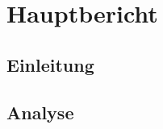 \documentclass[12pt, a4paper]{report}
\begin{document}
	
	
	
		
	
	
	
	
	
	\part{Hauptbericht}
	
	\chapter{Einleitung}
	
	
	
	
	
	
	\chapter{Analyse}
	
		
\end{document}
